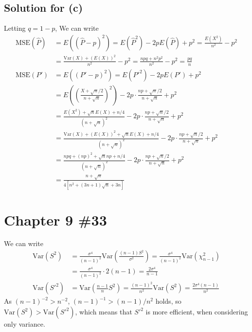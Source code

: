 \documentclass{scrartcl}
\begin{document}
\subsection{Solution for (c)}
Letting \(q = 1 - p\), We can write
\begin{align*}
  \mathrm{MSE}(\hat{P})
  &= E((\hat{P} - p)^2)
  = E(\hat{P}^2) - 2p E(\hat{P}) + p^2
  = \frac{E(X^2)}{n^2} - p^2 \\
  &= \frac{\mathrm{Var}(X) + (E(X))^2}{n^2} - p^2
  = \frac{npq + n^2 p^2}{n^2} - p^2
  = \frac{pq}{n} \\
  \mathrm{MSE}(P')
  &= E((P' - p)^2)
  = E(P'^2) - 2p E(P') + p^2 \\
  &= E \left( \left( \frac{X + \sqrt{n} / 2}{n + \sqrt{n}} \right)^2 \right)
    - 2p \cdot \frac{np + \sqrt{n} / 2}{n + \sqrt{n}} + p^2 \\
  &= \frac{E(X^2) + \sqrt{n} E(X) + n / 4}{(n + \sqrt{n})^2}
    - 2p \cdot \frac{np + \sqrt{n} / 2}{n + \sqrt{n}} + p^2 \\
  &= \frac{\mathrm{Var}(X) + (E(X))^2 + \sqrt{n} E(X) + n / 4}
    {(n + \sqrt{n})^2}
    - 2p \cdot \frac{np + \sqrt{n} / 2}{n + \sqrt{n}} + p^2 \\
  &= \frac{npq + (np)^2 + \sqrt{n} np + n / 4}{(n + \sqrt{n})^2}
    - 2p \cdot \frac{np + \sqrt{n} / 2}{n + \sqrt{n}} + p^2 \\
  &=\frac{n + \sqrt{n}}{4[ n^2 + (3n + 1) \sqrt{n} + 3n]}
\end{align*}

\section{Chapter 9 \#33}
We can write
\begin{align*}
  \mathrm{Var}(S^2)
  &= \frac{\sigma^4}{(n - 1)^2}
    \mathrm{Var} \left( \frac{(n - 1) S^2}{\sigma^2} \right)
  = \frac{\sigma^4}{(n - 1)^2} \mathrm{Var}(\chi^2_{n - 1}) \\
  &= \frac{\sigma^4}{(n - 1)^2} \cdot 2(n - 1)
  = \frac{2\sigma^4}{n - 1} \\
  \mathrm{Var}(S'^2)
  &= \mathrm{Var} \left( \frac{n - 1}{n} S^2 \right)
  = \frac{(n - 1)^2}{n^2} \mathrm{Var}(S^2)
  = \frac{2\sigma^4 (n - 1)}{n^2}
\end{align*}
As \((n - 1)^{-2} > n^{-2}\), \((n - 1)^{-1} > (n - 1) / n^2\) holds, so
\(\mathrm{Var}(S^2) > \mathrm{Var}(S'^2)\), which means that \(S'^2\) is more
efficient, when considering only variance.
\end{document}
